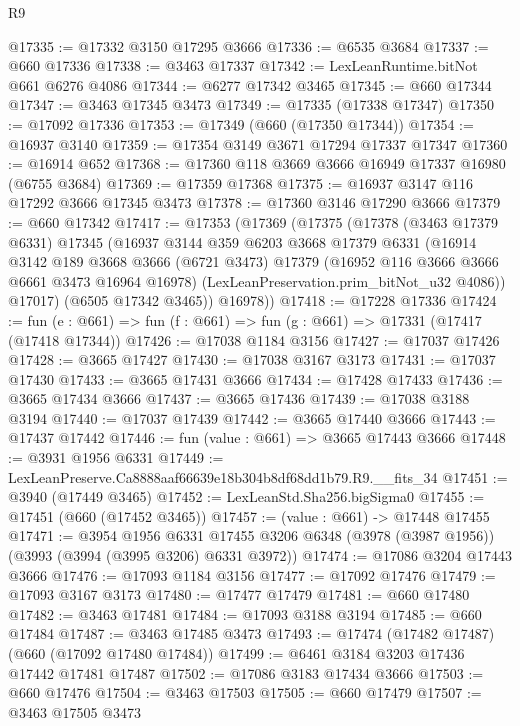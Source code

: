 \begin{lexlean}{R9}
\begin{coremodule}
@17335 := @17332 @3150 @17295 @3666
@17336 := @6535 @3684
@17337 := @660 @17336
@17338 := @3463 @17337
@17342 := LexLeanRuntime.bitNot @661 @6276 @4086
@17344 := @6277 @17342 @3465
@17345 := @660 @17344
@17347 := @3463 @17345 @3473
@17349 := @17335 (@17338 @17347)
@17350 := @17092 @17336
@17353 := @17349 (@660 (@17350 @17344))
@17354 := @16937 @3140
@17359 := @17354 @3149 @3671 @17294 @17337 @17347
@17360 := @16914 @652
@17368 := @17360 @118 @3669 @3666 @16949 @17337 @16980 (@6755 @3684)
@17369 := @17359 @17368
@17375 := @16937 @3147 @116 @17292 @3666 @17345 @3473
@17378 := @17360 @3146 @17290 @3666
@17379 := @660 @17342
@17417 := @17353
    (@17369
      (@17375
        (@17378
          (@3463 @17379 @6331)
          @17345
          (@16937
            @3144
            @359
            @6203
            @3668
            @17379
            @6331
            (@16914
              @3142
              @189
              @3668
              @3666
              (@6721 @3473)
              @17379
              (@16952 @116 @3666 @3666 @6661 @3473 @16964 @16978)
              (LexLeanPreservation.prim_bitNot_u32 @4086))
            @17017)
          (@6505 @17342 @3465))
        @16978))
@17418 := @17228 @17336
@17424 := fun (e : @661) => fun (f : @661) => fun (g : @661) => @17331 (@17417 (@17418 @17344))
@17426 := @17038 @1184 @3156
@17427 := @17037 @17426
@17428 := @3665 @17427
@17430 := @17038 @3167 @3173
@17431 := @17037 @17430
@17433 := @3665 @17431 @3666
@17434 := @17428 @17433
@17436 := @3665 @17434 @3666
@17437 := @3665 @17436
@17439 := @17038 @3188 @3194
@17440 := @17037 @17439
@17442 := @3665 @17440 @3666
@17443 := @17437 @17442
@17446 := fun (value : @661) => @3665 @17443 @3666
@17448 := @3931 @1956 @6331
@17449 := LexLeanPreserve.Ca8888aaf66639e18b304b8df68dd1b79.R9.__fits_34
@17451 := @3940 (@17449 @3465)
@17452 := LexLeanStd.Sha256.bigSigma0
@17455 := @17451 (@660 (@17452 @3465))
@17457 := (value : @661) -> @17448 @17455
@17471 := @3954
    @1956
    @6331
    @17455
    @3206
    @6348
    (@3978 (@3987 @1956))
    (@3993 (@3994 (@3995 @3206) @6331 @3972))
@17474 := @17086 @3204 @17443 @3666
@17476 := @17093 @1184 @3156
@17477 := @17092 @17476
@17479 := @17093 @3167 @3173
@17480 := @17477 @17479
@17481 := @660 @17480
@17482 := @3463 @17481
@17484 := @17093 @3188 @3194
@17485 := @660 @17484
@17487 := @3463 @17485 @3473
@17493 := @17474 (@17482 @17487) (@660 (@17092 @17480 @17484))
@17499 := @6461 @3184 @3203 @17436 @17442 @17481 @17487
@17502 := @17086 @3183 @17434 @3666
@17503 := @660 @17476
@17504 := @3463 @17503
@17505 := @660 @17479
@17507 := @3463 @17505 @3473

\end{coremodule}
\end{lexlean}
